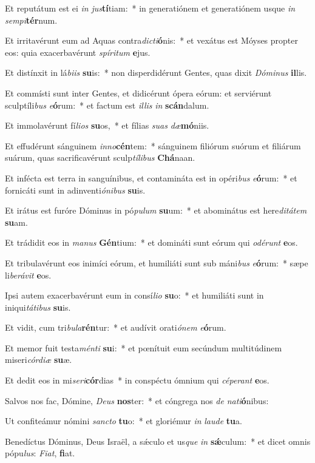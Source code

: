 \item Et reputátum est ei \textit{in} \textit{jus}\textbf{tí}tiam:~* in generatiónem et generatiónem usque \textit{in} \textit{sem}\textit{pi}\textbf{tér}num.
\item Et irritavérunt eum ad Aquas contra\textit{dic}\textit{ti}\textbf{ó}nis:~* et vexátus est Móyses propter eos: quia exacerbavérunt \textit{spí}\textit{ri}\textit{tum} \textbf{e}jus.
\item Et distínxit in lá\textit{bi}\textit{is} \textbf{su}is:~* non disperdidérunt Gentes, quas dixit \textit{Dó}\textit{mi}\textit{nus} \textbf{il}lis.
\item Et commísti sunt inter Gentes, et didicérunt ópera eórum: et serviérunt sculptíli\textit{bus} \textit{e}\textbf{ó}rum:~* et factum est \textit{il}\textit{lis} \textit{in} \textbf{scán}dalum.
\item Et immolavérunt fí\textit{li}\textit{os} \textbf{su}os,~* et fílias \textit{su}\textit{as} \textit{dæ}\textbf{mó}niis.
\item Et effudérunt sánguinem \textit{in}\textit{no}\textbf{cén}tem:~* sánguinem filiórum suórum et filiárum suárum, quas sacrificavérunt sculp\textit{tí}\textit{li}\textit{bus} \textbf{Chá}naan.
\item Et infécta est terra in sanguínibus, et contamináta est in opéri\textit{bus} \textit{e}\textbf{ó}rum:~* et fornicáti sunt in adinventi\textit{ó}\textit{ni}\textit{bus} \textbf{su}is.
\item Et irátus est furóre Dóminus in pó\textit{pu}\textit{lum} \textbf{su}um:~* et abominátus est here\textit{di}\textit{tá}\textit{tem} \textbf{su}am.
\item Et trádidit eos in \textit{ma}\textit{nus} \textbf{Gén}tium:~* et domináti sunt eórum qui \textit{o}\textit{dé}\textit{runt} \textbf{e}os.
\item Et tribulavérunt eos inimíci eórum, et humiliáti sunt sub máni\textit{bus} \textit{e}\textbf{ó}rum:~* sæpe li\textit{be}\textit{rá}\textit{vit} \textbf{e}os.
\item Ipsi autem exacerbavérunt eum in consí\textit{li}\textit{o} \textbf{su}o:~* et humiliáti sunt in iniqui\textit{tá}\textit{ti}\textit{bus} \textbf{su}is.
\item Et vidit, cum tri\textit{bu}\textit{la}\textbf{rén}tur:~* et audívit orati\textit{ó}\textit{nem} \textit{e}\textbf{ó}rum.
\item Et memor fuit testa\textit{mén}\textit{ti} \textbf{su}i:~* et pœnítuit eum secúndum multitúdinem miseri\textit{cór}\textit{di}\textit{æ} \textbf{su}æ.
\item Et dedit eos in mi\textit{se}\textit{ri}\textbf{cór}dias~* in conspéctu ómnium qui \textit{cé}\textit{pe}\textit{rant} \textbf{e}os.
\item Salvos nos fac, Dómine, \textit{De}\textit{us} \textbf{nos}ter:~* et cóngrega nos \textit{de} \textit{na}\textit{ti}\textbf{ó}nibus:
\item Ut confiteámur nómini \textit{sanc}\textit{to} \textbf{tu}o:~* et gloriémur \textit{in} \textit{lau}\textit{de} \textbf{tu}a.
\item Benedíctus Dóminus, Deus Israël, a sǽculo et us\textit{que} \textit{in} \textbf{sǽ}culum:~* et dicet omnis pópu\textit{lus}: \textit{Fi}\textit{at}, \textbf{fi}at.
